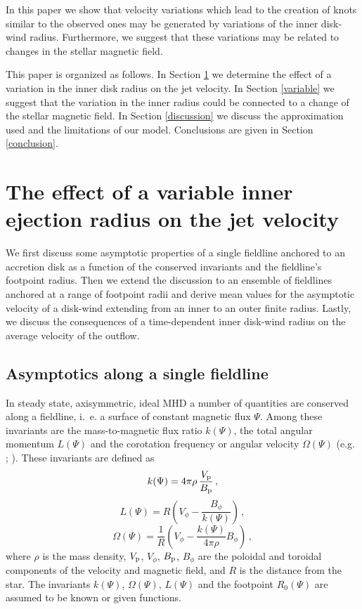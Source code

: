 \documentclass{emulateapj}
\begin{document}
In this paper 
we show that velocity variations which lead to the creation of knots similar to 
the observed ones may be generated by variations of the inner disk-wind 
radius. Furthermore, we suggest that these variations may be related
to changes in the stellar magnetic field.

This paper is organized as follows.
In Section \ref{model} we determine the effect of a
variation in the inner disk radius on the jet velocity.
In Section \ref{variable}
we suggest that the variation in the inner radius
could be connected to a
change of the stellar magnetic field.
In Section \ref{discussion} we discuss the approximation used and 
the limitations of our model. 
Conclusions are given in Section \ref{conclusion}.



\section{The effect of a variable inner ejection radius on the jet velocity}
\label{model}

We first discuss some
asymptotic properties of a single fieldline anchored to 
an accretion disk as a function of the conserved invariants
and the fieldline's footpoint radius. 
Then we extend the discussion to an ensemble of fieldlines
anchored at a range of footpoint radii and derive mean values for
the asymptotic velocity of a disk-wind extending from an inner to
an outer finite radius. Lastly, we discuss the consequences of a
time-dependent inner disk-wind radius on the average velocity of 
the outflow.

\subsection{Asymptotics along a single fieldline}

In steady state, axisymmetric, ideal MHD a number of quantities are
conserved along a fieldline, i.~e. a surface of constant magnetic flux
$\Psi$. Among these invariants are the
mass-to-magnetic flux ratio $k(\Psi)$, the total angular momentum
$L(\Psi)$ and the corotation frequency or angular velocity
$\Omega(\Psi)$ (e.g. \citealt{bla82}; \citealt{pel92}). 
These invariants are defined as
%
\begin{equation} \label{eq:streamfunc}
  k(\Psi) = 4\pi\rho \, \frac{V_{\rm p}}{B_{\rm p}} \,,
\end{equation}
%
\begin{equation} \label{eq:angmom}
  L(\Psi) = R \left( V_\phi - \frac{B_\phi}{k(\Psi)}\right) \,,
\end{equation}
%
\begin{equation} \label{eq:Omega} 
  \Omega(\Psi) = \frac{1}{R} \left(V_\phi - \frac{k(\Psi)}{4\pi\rho} B_\phi\right) \,,
\end{equation}
%
where $\rho$ is the mass density, $V_{\rm p}$, $V_\phi$, $B_{\rm p}$, $B_\phi$
are the poloidal and toroidal components of the velocity and magnetic field,
and $R$ is the distance from the star.
The invariants $k(\Psi)$, $\Omega(\Psi)$, $L(\Psi)$ and the footpoint $R_0(\Psi)$ 
are assumed to be known or given functions.
\end{document}
